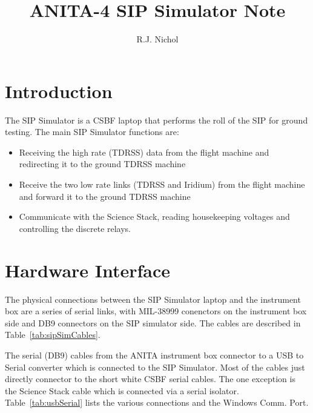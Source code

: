 \documentclass{article}
\begin{document}
\title{ANITA-4 SIP Simulator Note}
\author{R.J. Nichol}
  
\maketitle


\section{Introduction}
The SIP Simulator is a CSBF laptop that performs the roll of the SIP for ground testing. The main SIP Simulator functions are:
\begin{itemize}
\item Receiving the high rate (TDRSS) data from the flight machine and redirecting it to the ground TDRSS machine
\item Receive the two low rate links (TDRSS and Iridium) from the flight machine and forward it to the ground TDRSS machine
\item Communicate with the Science Stack, reading housekeeping voltages and controlling the discrete relays.
\end{itemize}

\section{Hardware Interface}
The physical connections between the SIP Simulator laptop and the instrument box are a series of serial links, with MIL-38999 conenctors on the instrument box side and DB9 connectors on the SIP simulator side. The cables are described in Table~\ref{tab:sipSimCables}.

The serial (DB9) cables from the ANITA instrument box connector to a USB to Serial converter which is connected to the SIP Simulator. Most of the cables just directly connector to the short white CSBF serial cables. The one exception is the Science Stack cable which is connected via a serial isolator. Table~\ref{tab:usbSerial} lists the various connections and the Windows Comm. Port.
\end{document}
